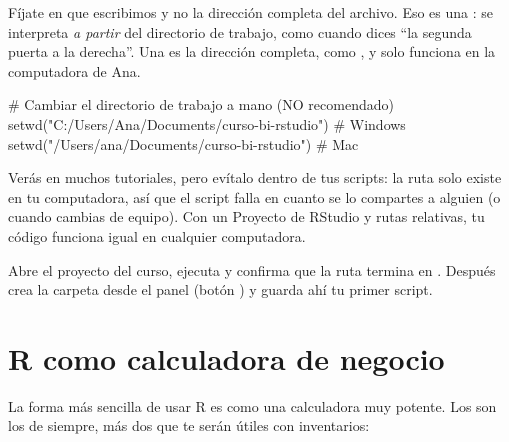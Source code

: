 Fíjate en que escribimos  y no la
dirección completa del archivo. Eso es una : se
interpreta \emph{a partir} del directorio de trabajo, como cuando dices ``la
segunda puerta a la derecha''. Una  es la dirección
completa, como , y
solo funciona en la computadora de Ana.

\begin{rnoejecutar}
# Cambiar el directorio de trabajo a mano (NO recomendado)
setwd("C:/Users/Ana/Documents/curso-bi-rstudio")        # Windows
setwd("/Users/ana/Documents/curso-bi-rstudio")          # Mac
\end{rnoejecutar}

\begin{advertencia}
Verás  en muchos tutoriales, pero evítalo dentro de tus
scripts: la ruta solo existe en tu computadora, así que el script falla en
cuanto se lo compartes a alguien (o cuando cambias de equipo). Con un
Proyecto de RStudio y rutas relativas, tu código funciona igual en cualquier
computadora.
\end{advertencia}

\begin{hazlotu}
Abre el proyecto del curso, ejecuta  y confirma que la ruta
termina en . Después crea la carpeta
 desde el panel  (botón )
y guarda ahí tu primer script.
\end{hazlotu}

\section{R como calculadora de negocio}
\label{sec:m1-calculadora}

La forma más sencilla de usar R es como una calculadora muy potente. Los
 son los de siempre, más dos que te serán
útiles con inventarios:


